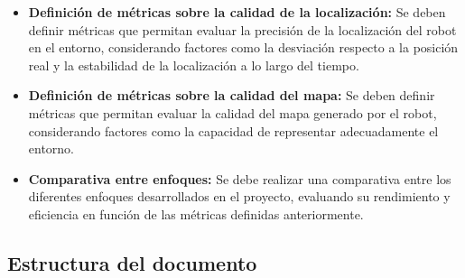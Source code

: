 \documentclass[12pt, a4paper, twoside]{article}
\begin{document}
\begin{itemize}
    \begin{itemize}
    \item \textbf{Definición de métricas sobre la calidad de la localización:} Se deben definir métricas que permitan evaluar 
      la precisión de la localización del robot en el entorno, considerando factores como la desviación respecto a la posición 
      real y la estabilidad de la localización a lo largo del tiempo.
    \item \textbf{Definición de métricas sobre la calidad del mapa:} Se deben definir métricas que permitan evaluar la calidad 
      del mapa generado por el robot, considerando factores como la capacidad de representar adecuadamente el entorno.
    \item \textbf{Comparativa entre enfoques:} Se debe realizar una comparativa entre los diferentes enfoques desarrollados 
      en el proyecto, evaluando su rendimiento y eficiencia en función de las métricas definidas anteriormente.
    \end{itemize}
\end{itemize}

\subsection{Estructura del documento}
\end{document}
